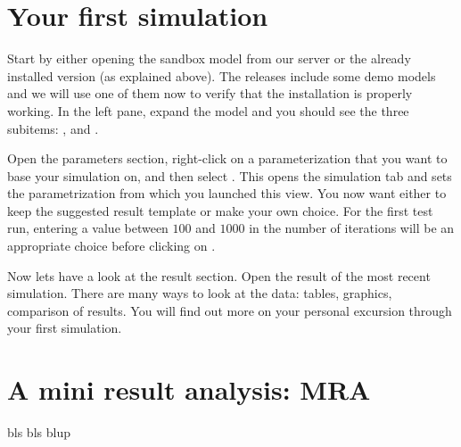 \section{Your first simulation}
\label{sec:firstSimulation}

Start \RA{} by either opening the sandbox model from our server or the already installed version (as explained above). The releases include some demo models and we will use one of them now to verify that the installation is properly working. In the left pane, expand the \PODRA{} model and you should see the three subitems: ,  and . 


Open the parameters section, right-click on a parameterization that you want to base your simulation on, and then select . This opens the simulation tab and sets the parametrization from which you launched this view. You now want either to keep the suggested result template or make your own choice. For the first test run, entering a value between $100$ and $1000$ in the number of iterations will be an appropriate choice before clicking on .


Now lets have a look at the result section. Open the result of the most recent simulation. There are many ways to look at the data: tables, graphics, comparison of results. You will find out more on your personal excursion through your first simulation.


\section{A mini result analysis: MRA}
\label{sec:miniResultAnaylsis}


bls bls blup
